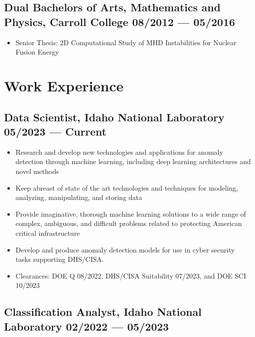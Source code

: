 \documentclass[letterpaper,11pt]{article}
\begin{document}
\subsection*{{\color{cvblue}Dual Bachelors of Arts, Mathematics and Physics,} {\normalsize \normalfont Carroll College} \hfill 08/2012 --- 05/2016} \vspace{-.1in}
\begin{itemize}
\item Senior Thesis: 2D Computational Study of MHD Instabilities for Nuclear Fusion Energy
\end{itemize}



\section{\color{cvblue}Work Experience } %

\subsection*{{\color{cvblue}Data Scientist, Idaho National Laboratory } \hfill 05/2023 — Current} 
\begin{itemize}
\item  Research and develop new technologies and applications for anomaly detection through machine learning, including deep learning architectures and novel methods
\item  Keep abreast of state of the art technologies and techniques for modeling, analyzing, manipulating, and storing data
\item  Provide imaginative, thorough machine learning solutions to a wide range of complex, ambiguous, and difficult problems related to protecting American critical infrastructure
\item  Develop and produce anomaly detection models for use in cyber security tasks supporting DHS/CISA.
\item  Clearances: DOE Q 08/2022, DHS/CISA Suitability 07/2023, and DOE SCI 10/2023
\end{itemize}


\subsection*{{\color{cvblue}Classification Analyst, Idaho National Laboratory } \hfill 02/2022 — 05/2023} 
 
\end{document}
